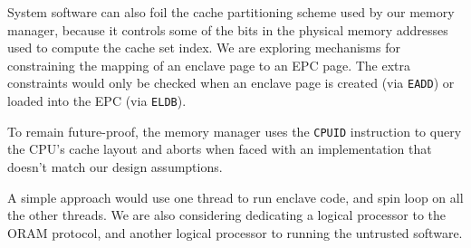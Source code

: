 System software can also foil the cache partitioning scheme used by our memory
manager, because it controls some of the bits in the physical memory addresses
used to compute the cache set index. We are exploring mechanisms for
constraining the mapping of an enclave page to an EPC page. The extra
constraints would only be checked when an enclave page is created (via
\texttt{EADD}) or loaded into the EPC (via \texttt{ELDB}).

To remain future-proof, the memory manager uses the \texttt{CPUID} instruction
\cite{intel2013manual} to query the CPU's cache layout and aborts when faced
with an implementation that doesn't match our design assumptions.




A simple approach would use one
thread to run enclave code, and spin loop on all the other threads. We are
also considering dedicating a logical processor to the ORAM protocol, and
another logical processor to running the untrusted software.
